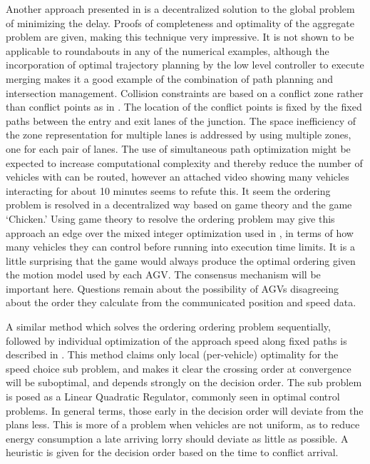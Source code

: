 Another approach presented in \cite{Liu2018} is a decentralized solution to the global problem of minimizing the delay. Proofs of completeness and optimality of the aggregate problem are given, making this technique very impressive. It is not shown to be applicable to roundabouts in any of the numerical examples, although the incorporation of optimal trajectory planning by the low level controller to execute merging makes it a good example of the combination of path planning and intersection management. Collision constraints are based on a conflict zone rather than conflict points as in \cite{Levin2017}. The location of the conflict points is fixed by the fixed paths between the entry and exit lanes of the junction. The space inefficiency of the zone representation for multiple lanes is addressed by using multiple zones, one for each pair of lanes. The use of simultaneous path optimization might be expected to increase computational complexity and thereby reduce the number of vehicles with can be routed, however an attached video showing many vehicles interacting for about 10 minutes seems to refute this. It seem the ordering problem is resolved in a decentralized way based on game theory and the game `Chicken.' Using game theory to resolve the ordering problem may give this approach an edge over the mixed integer optimization used in \cite{Levin2017}, in terms of how many vehicles they can control before running into execution time limits. It is a little surprising that the game would always produce the optimal ordering given the motion model used by each AGV. The consensus mechanism will be important here. Questions remain about the possibility of AGVs disagreeing about the order they calculate from the communicated position and speed data. 

A similar method which solves the ordering ordering problem sequentially, followed by individual optimization of the approach speed along fixed paths is described in \cite{DeCampos2017}. This method claims only local (per-vehicle) optimality for the speed choice sub problem, and makes it clear the crossing order at convergence will be suboptimal, and depends strongly on the decision order. The sub problem is posed as a Linear Quadratic Regulator, commonly seen in optimal control problems. In general terms, those early in the decision order will deviate from the plans less. This is more of a problem when vehicles are not uniform, as to reduce energy consumption a late arriving lorry should deviate as little as possible. A heuristic is given for the decision order based on the time to conflict arrival.

